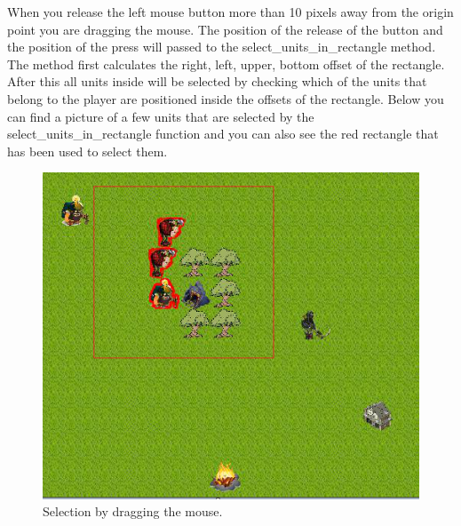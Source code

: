 When you release the left mouse button more than 10 pixels away from the origin point you are dragging the mouse. The position of the release of the button and the position of the press will passed to the select\_units\_in\_rectangle method. The method first calculates the right, left, upper, bottom offset of the rectangle. After this all units inside will be selected by checking which of the units that belong to the player are positioned inside the offsets of the rectangle. Below you can find a picture of a few units that are selected by the select\_units\_in\_rectangle function and you can also see the red rectangle that has been used to select them. 

\begin{figure}[!htb]
    \centering
    \includegraphics[scale=1.0]{res/SelectionRectangle.png}
    \caption{Selection by dragging the mouse.}
\end{figure}
\newpage

